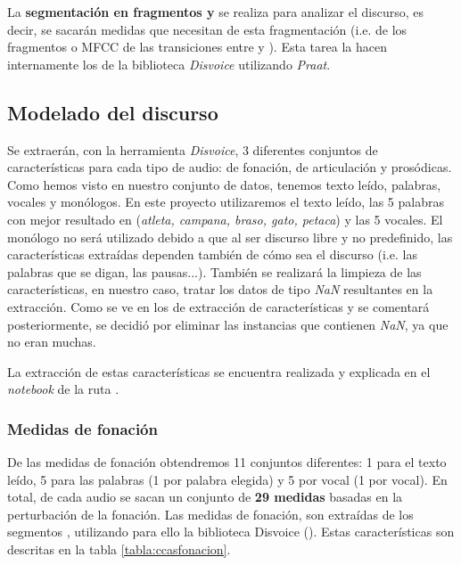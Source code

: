La \textbf{segmentación en fragmentos  y } se realiza para analizar el discurso, es decir, se sacarán medidas que necesitan de esta fragmentación (i.e.  de los fragmentos  o MFCC de las transiciones entre  y ). Esta tarea la hacen internamente los  de la biblioteca \textit{Disvoice} utilizando \textit{Praat}.

\subsection{Modelado del discurso} \label{subs:modeldisc}
Se extraerán, con la herramienta \textit{Disvoice}, 3 diferentes conjuntos de características para cada tipo de audio: de fonación, de articulación y prosódicas. Como hemos visto en nuestro conjunto de datos, tenemos texto leído, palabras, vocales y monólogos. En este proyecto utilizaremos el texto leído, las 5 palabras con mejor resultado en \cite{Orz2016} (\textit{atleta, campana, braso, gato, petaca}) y las 5 vocales. El monólogo no será utilizado debido a que al ser discurso libre y no predefinido, las características extraídas dependen también de cómo sea el discurso (i.e. las palabras que se digan, las pausas...). También se realizará la limpieza de las características, en nuestro caso, tratar los datos de tipo \textit{NaN} resultantes en la extracción. Como se ve en los  de extracción de características y se comentará posteriormente, se decidió por eliminar las instancias que contienen \textit{NaN}, ya que no eran muchas.

La extracción de estas características se encuentra realizada y explicada en el \textit{notebook} de la ruta .


\subsubsection{Medidas de fonación}
De las medidas de fonación obtendremos 11 conjuntos diferentes: 1 para el texto leído, 5 para las palabras (1 por palabra elegida) y 5 por vocal (1 por vocal). En total, de cada audio se sacan un conjunto de \textbf{29 medidas} basadas en la perturbación de la fonación. Las medidas de fonación, son extraídas de los segmentos , utilizando para ello la biblioteca Disvoice (). Estas características son descritas en la tabla \ref{tabla:ccasfonacion}.

